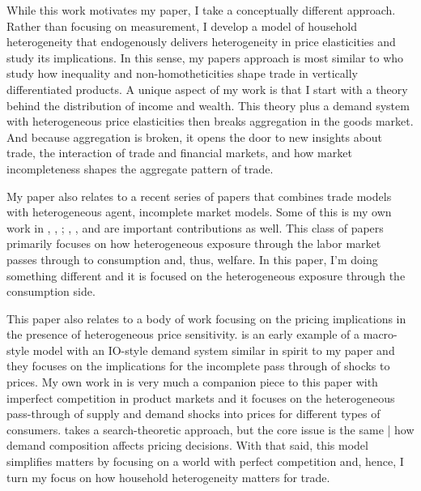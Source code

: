 \documentclass[12pt,pdftex]{article}
\begin{document}
\begin{onehalfspacing}
While this work motivates my paper, I take a conceptually different approach. Rather than focusing on measurement, I develop a model of household heterogeneity that endogenously delivers heterogeneity in price elasticities and study its implications. In this sense, my papers approach is most similar to \citet*{fajgelbaum2011income} who study how inequality and non-homotheticities shape trade in vertically differentiated products. A unique aspect of my work is that I start with a theory behind the distribution of income and wealth. This theory plus a demand system with heterogeneous price elasticities then breaks aggregation in the goods market. And because aggregation is broken, it opens the door to new insights about trade, the interaction of trade and financial markets, and how market incompleteness shapes the aggregate pattern of trade.

My paper also relates to a recent series of papers that combines trade models with heterogeneous agent, incomplete market models. Some of this is my own work in \citet{lyon2018redistributing}, \citet{lyon2019}, \citet{waugh_consumption}; \citet*{gaston2018}, \citet{carroll2020heterogeneous}, and \citet{dvorkin2023heterogeneous} are important contributions as well. This class of papers primarily focuses on how heterogeneous exposure through the labor market passes through to consumption and, thus, welfare. In this paper, I'm doing something different and it is focused on the heterogeneous exposure through the consumption side.

This paper also relates to a body of work focusing on the pricing implications in the presence of heterogeneous price sensitivity. \citet{nakamura2010accounting} is an early example of a macro-style model with an IO-style demand system similar in spirit to my paper and they focuses on the implications for the incomplete pass through of shocks to prices. My own work in \citet{p-iq} is very much a companion piece to this paper with imperfect competition in product markets and it focuses on the heterogeneous pass-through of supply and demand shocks into prices for different types of consumers. \citet{nord2022shopping} takes a search-theoretic approach, but the core issue is the same | how demand composition affects pricing decisions. With that said, this model simplifies matters by focusing on a world with perfect competition and, hence, I turn my focus on how household heterogeneity matters for trade.



\end{onehalfspacing}
\end{document}
